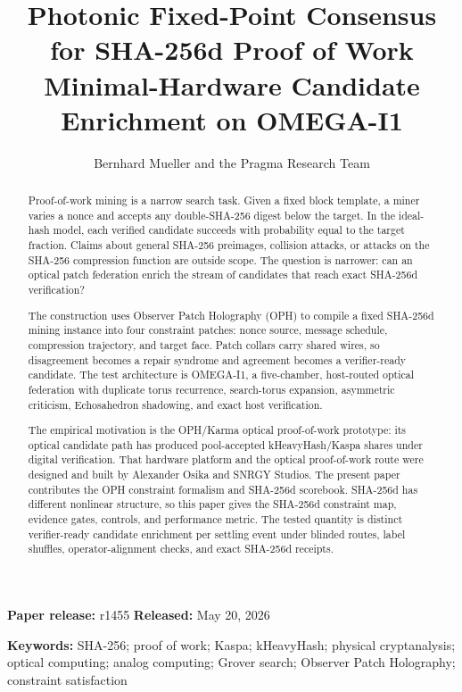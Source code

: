 \documentclass[11pt]{article}
\title{\textbf{Photonic Fixed-Point Consensus for SHA-256d Proof of Work}\\[0.25em]
\large Minimal-Hardware Candidate Enrichment on OMEGA-I1}
\author{Bernhard Mueller and the Pragma Research Team}
\date{\OPHPaperReleaseDate}
\theoremstyle{definition}
\theoremstyle{remark}
\newcommand{\OPHPaperReleaseID}{r1455}
\newcommand{\OPHPaperReleaseDate}{May 20, 2026}
\begin{document}
\maketitle
\begin{center}
\small\textbf{Paper release:} \OPHPaperReleaseID\quad
\textbf{Released:} \OPHPaperReleaseDate
\end{center}

\begin{abstract}
Proof-of-work mining is a narrow search task. Given a fixed block template, a
miner varies a nonce and accepts any double-SHA-256 digest below the target. In
the ideal-hash model, each verified candidate succeeds with probability equal
to the target fraction. Claims about general SHA-256 preimages, collision
attacks, or attacks on the SHA-256 compression function are outside scope. The
question is narrower: can an optical patch federation enrich the stream of
candidates that reach exact SHA-256d verification?

The construction uses Observer Patch Holography (OPH) to compile a fixed
SHA-256d mining instance into four constraint patches: nonce source, message
schedule, compression trajectory, and target face. Patch collars carry shared
wires, so disagreement becomes a repair syndrome and agreement becomes a
verifier-ready candidate. The test architecture is OMEGA-I1, a five-chamber,
host-routed optical federation with duplicate torus recurrence, search-torus
expansion, asymmetric criticism, Echosahedron shadowing, and exact host
verification.

The empirical motivation is the OPH/Karma optical proof-of-work prototype: its
optical candidate path has produced pool-accepted kHeavyHash/Kaspa shares under
digital verification. That hardware platform and the optical proof-of-work
route were designed and built by Alexander Osika and SNRGY Studios. The present
paper contributes the OPH constraint formalism and SHA-256d scorebook.
SHA-256d has different nonlinear structure, so this paper gives the SHA-256d
constraint map, evidence gates, controls, and performance metric. The tested
quantity is distinct verifier-ready candidate enrichment per settling event
under blinded routes, label shuffles, operator-alignment checks, and exact
SHA-256d receipts.
\end{abstract}

\noindent\textbf{Keywords:} SHA-256; proof of work; Kaspa; kHeavyHash;
physical cryptanalysis; optical computing; analog computing; Grover search;
Observer Patch Holography; constraint satisfaction
\end{document}

